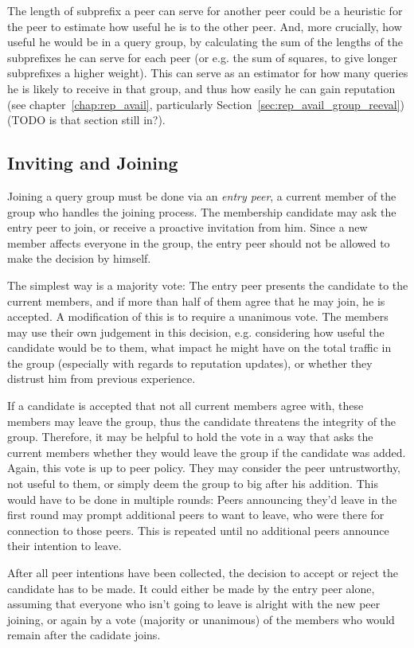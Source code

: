 The length of subprefix a peer can serve for another peer could be a heuristic
for the peer to estimate how useful he is to the other peer. And, more
crucially, how useful he would be in a query group, by calculating the sum of
the lengths of the subprefixes he can serve for each peer (or e.g. the sum of
squares, to give longer subprefixes a higher weight). This can serve as an
estimator for how many queries he is likely to receive in that group, and thus
how easily he can gain reputation (see chapter~\ref{chap:rep_avail},
particularly Section~\ref{sec:rep_avail_group_reeval}) (TODO is that section
still in?).

\subsection{Inviting and Joining}
Joining a query group must be done via an \emph{entry peer}, a current member of
the group who handles the joining process. The membership candidate may ask the
entry peer to join, or receive a proactive invitation from him. Since a new
member affects everyone in the group, the entry peer should not be allowed to
make the decision by himself.

The simplest way is a majority vote: The entry peer presents the candidate to
the current members, and if more than half of them agree that he may join, he is
accepted. A modification of this is to require a unanimous vote. The members may
use their own judgement in this decision, e.g. considering how useful the
candidate would be to them, what impact he might have on the total traffic in
the group (especially with regards to reputation updates), or whether they
distrust him from previous experience.

If a candidate is accepted that not all current members agree with, these
members may leave the group, thus the candidate threatens the integrity of the
group. Therefore, it may be helpful to hold the vote in a way that asks the
current members whether they would leave the group if the candidate was added.
Again, this vote is up to peer policy. They may consider the peer untrustworthy,
not useful to them, or simply deem the group to big after his addition.
This would have to be done in multiple rounds: Peers announcing they'd leave in
the first round may prompt additional peers to want to leave, who were there
for connection to those peers. This is repeated until no additional peers
announce their intention to leave.

After all peer intentions have been collected, the decision to accept or reject
the candidate has to be made. It could either be made by the entry peer alone,
assuming that everyone who isn't going to leave is alright with the new peer
joining, or again by a vote (majority or unanimous) of the members who would
remain after the cadidate joins.

